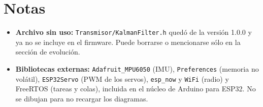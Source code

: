 \documentclass[11pt,a4paper]{article}
\begin{document}
\section*{Notas}
\begin{itemize}
  \item \textbf{Archivo sin uso:} \texttt{Transmisor/KalmanFilter.h} quedó de la versión 1.0.0 y ya no se incluye en el firmware. Puede borrarse o mencionarse sólo en la sección de evolución.
  \item \textbf{Bibliotecas externas:} \texttt{Adafruit\_MPU6050} (IMU), \texttt{Preferences} (memoria no volátil), \texttt{ESP32Servo} (PWM de los servos), \texttt{esp\_now} y \texttt{WiFi} (radio) y FreeRTOS (tareas y colas), incluida en el núcleo de Arduino para ESP32. No se dibujan para no recargar los diagramas.
\end{itemize}
\end{document}
